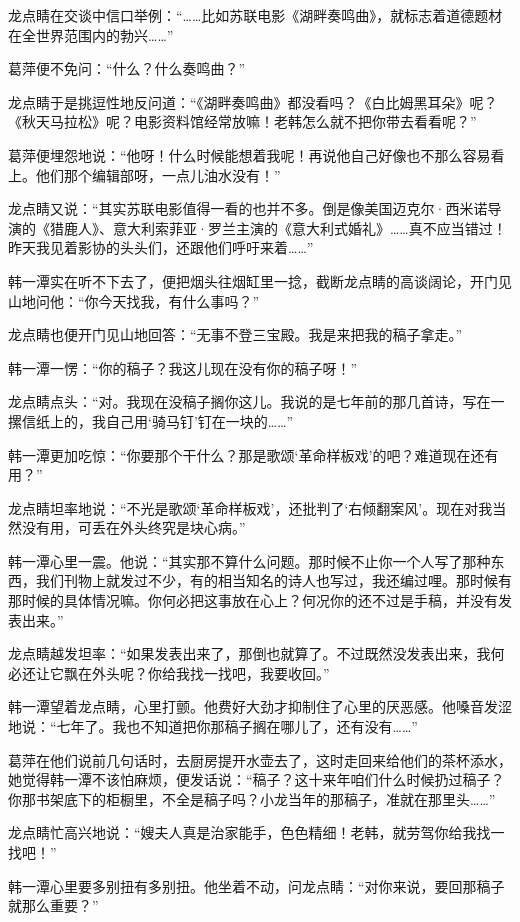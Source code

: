 \par 龙点睛在交谈中信口举例：“……比如苏联电影《湖畔奏鸣曲》，就标志着道德题材在全世界范围内的勃兴……”
\par 葛萍便不免问：“什么？什么奏鸣曲？”
\par 龙点睛于是挑逗性地反问道：“《湖畔奏鸣曲》都没看吗？《白比姆黑耳朵》呢？《秋天马拉松》呢？电影资料馆经常放嘛！老韩怎么就不把你带去看看呢？”
\par 葛萍便埋怨地说：“他呀！什么时候能想着我呢！再说他自己好像也不那么容易看上。他们那个编辑部呀，一点儿油水没有！”
\par 龙点睛又说：“其实苏联电影值得一看的也并不多。倒是像美国迈克尔·西米诺导演的《猎鹿人》、意大利索菲亚·罗兰主演的《意大利式婚礼》……真不应当错过！昨天我见着影协的头头们，还跟他们呼吁来着……”
\par 韩一潭实在听不下去了，便把烟头往烟缸里一捻，截断龙点睛的高谈阔论，开门见山地问他：“你今天找我，有什么事吗？”
\par 龙点睛也便开门见山地回答：“无事不登三宝殿。我是来把我的稿子拿走。”
\par 韩一潭一愣：“你的稿子？我这儿现在没有你的稿子呀！”
\par 龙点睛点头：“对。我现在没稿子搁你这儿。我说的是七年前的那几首诗，写在一摞信纸上的，我自己用‘骑马钉’钉在一块的……”
\par 韩一潭更加吃惊：“你要那个干什么？那是歌颂‘革命样板戏’的吧？难道现在还有用？”
\par 龙点睛坦率地说：“不光是歌颂‘革命样板戏’，还批判了‘右倾翻案风’。现在对我当然没有用，可丢在外头终究是块心病。”
\par 韩一潭心里一震。他说：“其实那不算什么问题。那时候不止你一个人写了那种东西，我们刊物上就发过不少，有的相当知名的诗人也写过，我还编过哩。那时候有那时候的具体情况嘛。你何必把这事放在心上？何况你的还不过是手稿，并没有发表出来。”
\par 龙点睛越发坦率：“如果发表出来了，那倒也就算了。不过既然没发表出来，我何必还让它飘在外头呢？你给我找一找吧，我要收回。”
\par 韩一潭望着龙点睛，心里打颤。他费好大劲才抑制住了心里的厌恶感。他嗓音发涩地说：“七年了。我也不知道把你那稿子搁在哪儿了，还有没有……”
\par 葛萍在他们说前几句话时，去厨房提开水壶去了，这时走回来给他们的茶杯添水，她觉得韩一潭不该怕麻烦，便发话说：“稿子？这十来年咱们什么时候扔过稿子？你那书架底下的柜橱里，不全是稿子吗？小龙当年的那稿子，准就在那里头……”
\par 龙点睛忙高兴地说：“嫂夫人真是治家能手，色色精细！老韩，就劳驾你给我找一找吧！”
\par 韩一潭心里要多别扭有多别扭。他坐着不动，问龙点睛：“对你来说，要回那稿子就那么重要？”
